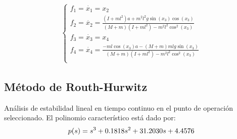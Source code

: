 
\begin{eqnarray}
  \label{eq:sistema}
  \left\{
  \begin{array}{ll}
    f_1 = \displaystyle\dot{x_1} = \displaystyle x_2 \\
    f_2 = \displaystyle\dot{x_2} =
            \displaystyle\frac{(I + ml^2)a + m^2l^2g\sin(x_3)\cos(x_3)}
              {(M + m)(I + ml^2)-m^2l^2\cos^2(x_3)}\\
    f_3 = \displaystyle\dot{x_3} = \displaystyle x_4\\
    f_4 = \dot{x_4} = \displaystyle\frac{-ml\cos(x_3)a - (M + m)mlg\sin(x_3)}
                         {(M + m)(I + ml^2) - m^2l^2\cos^2(x_3)}\\
  \end{array}
  \right.
\end{eqnarray}

\subsection{Método de Routh-Hurwitz}
Análisis de estabilidad lineal en tiempo continuo en el punto de operación seleccionado. El polinomio característico está dado por:
\begin{equation}
  \label{eq:polcar}
  p(s) = s^3 + 0.1818 s^2 + 31.2030 s + 4.4576 \\
\end{equation}
